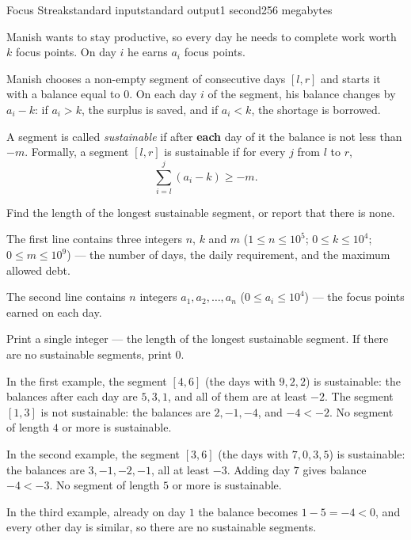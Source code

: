 \begin{problem}{Focus Streak}{standard input}{standard output}{1 second}{256 megabytes}

Manish wants to stay productive, so every day he needs to complete work worth $k$ focus points. On day $i$ he earns $a_i$ focus points.

Manish chooses a non-empty segment of consecutive days $[l, r]$ and starts it with a balance equal to $0$. On each day $i$ of the segment, his balance changes by $a_i - k$: if $a_i > k$, the surplus is saved, and if $a_i < k$, the shortage is borrowed.

A segment is called \textit{sustainable} if after \textbf{each} day of it the balance is not less than $-m$. Formally, a segment $[l, r]$ is sustainable if for every $j$ from $l$ to $r$,
$$\sum_{i=l}^{j} (a_i - k) \ge -m.$$

Find the length of the longest sustainable segment, or report that there is none.

\InputFile
The first line contains three integers $n$, $k$ and $m$ ($1 \le n \le 10^5$; $0 \le k \le 10^4$; $0 \le m \le 10^9$) --- the number of days, the daily requirement, and the maximum allowed debt.

The second line contains $n$ integers $a_1, a_2, \ldots, a_n$ ($0 \le a_i \le 10^4$) --- the focus points earned on each day.

\OutputFile
Print a single integer --- the length of the longest sustainable segment. If there are no sustainable segments, print $0$.

\Examples

\begin{example}
%
%
%
\end{example}

\Note
In the first example, the segment $[4, 6]$ (the days with $9, 2, 2$) is sustainable: the balances after each day are $5, 3, 1$, and all of them are at least $-2$. The segment $[1, 3]$ is not sustainable: the balances are $2, -1, -4$, and $-4 < -2$. No segment of length $4$ or more is sustainable.

In the second example, the segment $[3, 6]$ (the days with $7, 0, 3, 5$) is sustainable: the balances are $3, -1, -2, -1$, all at least $-3$. Adding day $7$ gives balance $-4 < -3$. No segment of length $5$ or more is sustainable.

In the third example, already on day $1$ the balance becomes $1 - 5 = -4 < 0$, and every other day is similar, so there are no sustainable segments.

\end{problem}
